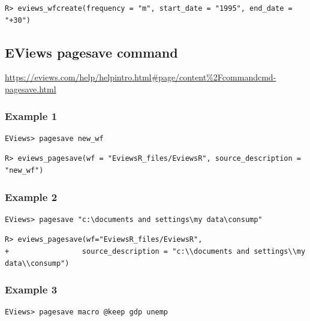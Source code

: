 \begin{verbatim}
R> eviews_wfcreate(frequency = "m", start_date = "1995", end_date = "+30")
\end{verbatim}

\hypertarget{eviews-pagesave-command}{%
\subsection{EViews pagesave command}\label{eviews-pagesave-command}}

\url{https://eviews.com/help/helpintro.html\#page/content\%2Fcommandcmd-pagesave.html}

\hypertarget{example-1-3}{%
\subsubsection{Example 1}\label{example-1-3}}

\begin{verbatim}
EViews> pagesave new_wf
\end{verbatim}

\begin{verbatim}
R> eviews_pagesave(wf = "EviewsR_files/EviewsR", source_description = "new_wf")
\end{verbatim}

\hypertarget{example-2-3}{%
\subsubsection{Example 2}\label{example-2-3}}

\begin{verbatim}
EViews> pagesave "c:\documents and settings\my data\consump"
\end{verbatim}

\begin{verbatim}
R> eviews_pagesave(wf="EviewsR_files/EviewsR",
+                 source_description = "c:\\documents and settings\\my data\\consump")
\end{verbatim}

\hypertarget{example-3-3}{%
\subsubsection{Example 3}\label{example-3-3}}

\begin{verbatim}
EViews> pagesave macro @keep gdp unemp
\end{verbatim}

